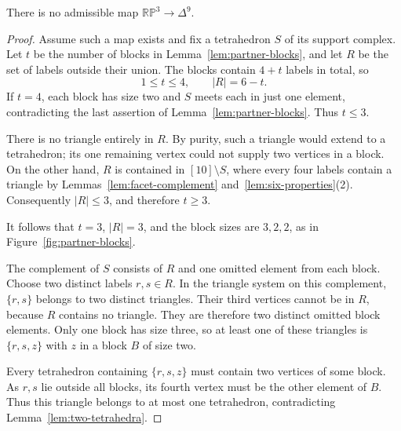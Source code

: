 \begin{theorem}\label{thm:no-ten-labels}
There is no admissible map $\mathbb{RP}^3\to\Delta^9$.
\end{theorem}

\begin{proof}
Assume such a map exists and fix a tetrahedron $S$ of its support
complex. Let $t$ be the number of blocks in
Lemma~\ref{lem:partner-blocks}, and let $R$ be the set of labels outside
their union. The blocks contain $4+t$ labels in total, so
\[
 1\le t\le4,\qquad |R|=6-t.
\]
If $t=4$, each block has size two and $S$ meets each in just one
element, contradicting the last assertion of
Lemma~\ref{lem:partner-blocks}. Thus $t\le3$.

There is no triangle entirely in $R$. By purity, such a triangle would
extend to a tetrahedron; its one remaining vertex could not supply two
vertices in a block. On the other hand, $R$ is contained in
$[10]\setminus S$, where every four labels contain a triangle by
Lemmas~\ref{lem:facet-complement} and~\ref{lem:six-properties}(2).
Consequently $|R|\le3$, and therefore $t\ge3$.

It follows that $t=3$, $|R|=3$, and the block sizes are $3,2,2$,
as in Figure~\ref{fig:partner-blocks}.


The complement of $S$ consists of $R$ and one omitted element from
each block. Choose two distinct labels $r,s\in R$. In the triangle
system on this complement, $\{r,s\}$ belongs to two distinct triangles.
Their third vertices cannot be in $R$, because $R$ contains no
triangle. They are therefore two distinct omitted block elements.
Only one block has size three, so at least one of these triangles is
$\{r,s,z\}$ with $z$ in a block $B$ of size two.

Every tetrahedron containing $\{r,s,z\}$ must contain two vertices of
some block. As $r,s$ lie outside all blocks, its fourth vertex must be
the other element of $B$. Thus this triangle belongs to at most one
tetrahedron, contradicting Lemma~\ref{lem:two-tetrahedra}.
\end{proof}
